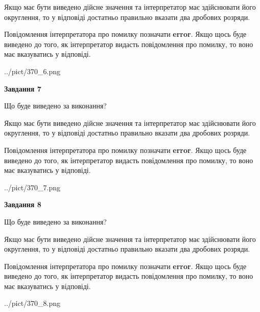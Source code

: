 \documentclass[12pt, ukrainian]{article}
\begin{document}
{\begin {Large}
Якщо має бути виведено дійсне значення та інтерпретатор має здійснювати його округлення, 
то у відповіді достатньо правильно вказати два дробових розряди.

Повідомлення інтерпретатора про помилку позначати \textbf{error}.
Якщо щось буде виведено до того, як інтерпретатор видасть повідомлення про помилку, 
то воно має вказуватись у відповіді. \par

\begin{center}
	{../pict/370_6.png}
\end{center}
\newpage

{\begin {center}\textbf{Завдання 7}\end {center}}\par
Що буде виведено за виконання? \par

Якщо має бути виведено дійсне значення та інтерпретатор має здійснювати його округлення, 
то у відповіді достатньо правильно вказати два дробових розряди.

Повідомлення інтерпретатора про помилку позначати \textbf{error}.
Якщо щось буде виведено до того, як інтерпретатор видасть повідомлення про помилку, 
то воно має вказуватись у відповіді. \par

\begin{center}
	{../pict/370_7.png}
\end{center}
\newpage

{\begin {center}\textbf{Завдання 8}\end {center}}\par
Що буде виведено за виконання? \par

Якщо має бути виведено дійсне значення та інтерпретатор має здійснювати його округлення, 
то у відповіді достатньо правильно вказати два дробових розряди.

Повідомлення інтерпретатора про помилку позначати \textbf{error}.
Якщо щось буде виведено до того, як інтерпретатор видасть повідомлення про помилку, 
то воно має вказуватись у відповіді. \par

\begin{center}
	{../pict/370_8.png}
\end{center}
\newpage


\end{Large}}
\end{document}
